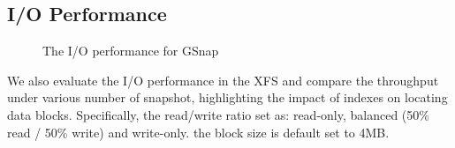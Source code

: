 \documentclass[sigconf, nonacm]{acmart}
\begin{document}
\subsection{I/O Performance}


\begin{figure}[htbp]
	\centering
	\hspace{-5in}
	\hspace{-5in}
	\caption{The I/O performance for GSnap}
	\label{fig:IO_performance}
\end{figure}

\label{IPerforamce}
We also evaluate the I/O performance in the XFS and compare the throughput under various number of snapshot, highlighting the impact of indexes on locating data blocks. Specifically, the read/write ratio set as: read-only, balanced (50\% read / 50\% write) and write-only. the block size is default set to 4MB.
\end{document}
